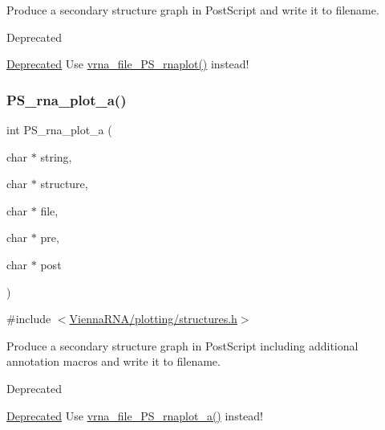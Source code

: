 Produce a secondary structure graph in Post\+Script and write it to \textquotesingle{}filename\textquotesingle{}. 

\begin{DoxyRefDesc}{Deprecated}
\item[\hyperlink{deprecated__deprecated000160}{Deprecated}]Use \hyperlink{group__plotting__utils_gabdc8f6548ba4a3bc3cd868ccbcfdb86a}{vrna\+\_\+file\+\_\+\+P\+S\+\_\+rnaplot()} instead! \end{DoxyRefDesc}
\mbox{\label{group__plotting__utils_ga47856b2504b566588785597b6ebb8271}} 
\subsubsection{\texorpdfstring{P\+S\+\_\+rna\+\_\+plot\+\_\+a()}{PS\_rna\_plot\_a()}}
{\footnotesize\ttfamily int P\+S\+\_\+rna\+\_\+plot\+\_\+a (\begin{DoxyParamCaption}\item[{char $\ast$}]{string,  }\item[{char $\ast$}]{structure,  }\item[{char $\ast$}]{file,  }\item[{char $\ast$}]{pre,  }\item[{char $\ast$}]{post }\end{DoxyParamCaption})}



{\ttfamily \#include $<$\hyperlink{plotting_2structures_8h}{Vienna\+R\+N\+A/plotting/structures.\+h}$>$}



Produce a secondary structure graph in Post\+Script including additional annotation macros and write it to \textquotesingle{}filename\textquotesingle{}. 

\begin{DoxyRefDesc}{Deprecated}
\item[\hyperlink{deprecated__deprecated000161}{Deprecated}]Use \hyperlink{group__plotting__utils_ga139a31dd0ba9fc6612431f67de901c31}{vrna\+\_\+file\+\_\+\+P\+S\+\_\+rnaplot\+\_\+a()} instead! \end{DoxyRefDesc}
\mbox{\label{group__plotting__utils_ga32fa0f97625119e9d24dd2e7153abc4f}} 

